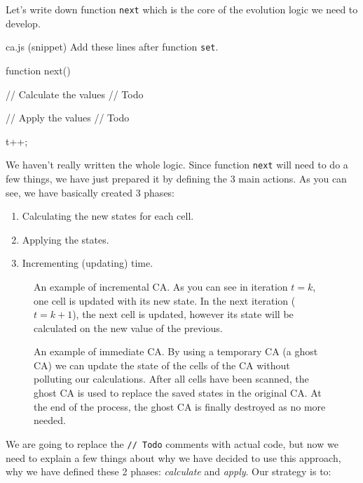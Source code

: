 Let's write down function \texttt{next} which is the core of the evolution logic we need to develop.

\begin{programcode}{ca.js (snippet)}
Add these lines after function \texttt{set}.
\begin{code}
function next() {
  // Calculate the values
  // Todo

  // Apply the values
  // Todo

  t++;
}
\end{code}
\end{programcode}

We haven't really written the whole logic. Since function \texttt{next} will need to do a few things, we
have just prepared it by defining the 3 main actions. As you can see, we have basically created 3 phases:

\begin{enumerate}
\item Calculating the new states for each cell.
\item Applying the states.
\item Incrementing (updating) time.
\end{enumerate}

%
\begin{figure}[b]
\sidecaption

%
%
\caption{An example of incremental CA. As you can see in iteration $t=k$, one cell is updated
with its new state. In the next iteration ($t=k+1$), the next cell is updated, however its state
will be calculated on the new value of the previous.}
\label{fig:updatecainc}
\end{figure}
%

%
\begin{figure}[b]
\sidecaption

%
%
\caption{An example of immediate CA. By using a temporary CA (a ghost CA) we can update
the state of the cells of the CA without polluting our calculations. After all cells have been scanned, the
ghost CA is used to replace the saved states in the original CA. At the end of the process, the ghost CA is
finally destroyed as no more needed.}
\label{fig:updatecaimm}
\end{figure}
%

We are going to replace the \texttt{// Todo} comments with actual code, but now we need to explain a few
things about why we have decided to use this approach, why we have defined these 2 phases: 
\textit{calculate} and \textit{apply}. Our strategy is to:

